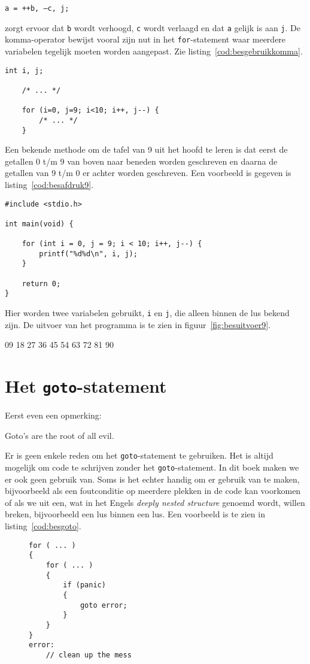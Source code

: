 \hspace*{1em}\texttt{a = ++b, --c, j;}

zorgt ervoor dat \texttt{b} wordt verhoogd, \texttt{c} wordt verlaagd en dat \texttt{a} gelijk is aan \texttt{j}. De komma-operator bewijst vooral zijn nut in het \texttt{for}-statement waar meerdere variabelen tegelijk moeten worden aangepast. Zie listing~\ref{cod:besgebruikkomma}.

\begin{lstlisting}[caption=Gebruik van de komma-operator.,label=cod:besgebruikkomma]
    int i, j;
    
    /* ... */
    
    for (i=0, j=9; i<10; i++, j--) {
        /* ... */
    }
\end{lstlisting}

Een bekende methode om de tafel van 9 uit het hoofd te leren is dat eerst de getallen 0 t/m 9 van boven naar beneden worden geschreven en daarna de getallen van 9 t/m 0 er achter worden geschreven. Een voorbeeld is gegeven is listing~\ref{cod:besafdruk9}.


\begin{lstlisting}[caption=Afdrukken van de tafel van 9.,label=cod:besafdruk9]
#include <stdio.h>

int main(void) {

	for (int i = 0, j = 9; i < 10; i++, j--) {
		printf("%d%d\n", i, j);
	}

	return 0;
}
\end{lstlisting}

Hier worden twee variabelen gebruikt, \texttt{i} en \texttt{j}, die alleen binnen de lus bekend zijn. De uitvoer van het programma is te zien in figuur~\ref{fig:besuitvoer9}.

\begin{dosbox}[title=Uitvoer van de tafel van 9.,label=fig:besuitvoer9]
09
18
27
36
45
54
63
72
81
90
\end{dosbox}

\section{Het \texttt{goto}-statement}
Eerst even een opmerking:

\begin{displayquote}
Goto's are the root of all evil.
\end{displayquote}

Er is geen enkele reden om het \texttt{goto}-statement te gebruiken. Het is altijd mogelijk om code te schrijven zonder het \texttt{goto}-statement. In dit boek maken we er ook geen gebruik van. Soms is het echter handig om er gebruik van te maken, bijvoorbeeld als een foutconditie op meerdere plekken in de code kan voorkomen of als we uit een, wat in het Engels \textsl{deeply nested structure} genoemd wordt, willen breken, bijvoorbeeld een lus binnen een lus. Een voorbeeld is te zien in listing~\ref{cod:besgoto}.


\begin{figure}[!ht]
\begin{lstlisting}[caption=Gebruik van het \texttt{goto}-statement.,label=cod:besgoto]
for ( ... )
{
    for ( ... )
    {
        if (panic)
        {
            goto error;
        }
    }   
}
error:
    // clean up the mess
\end{lstlisting}
\end{figure}
